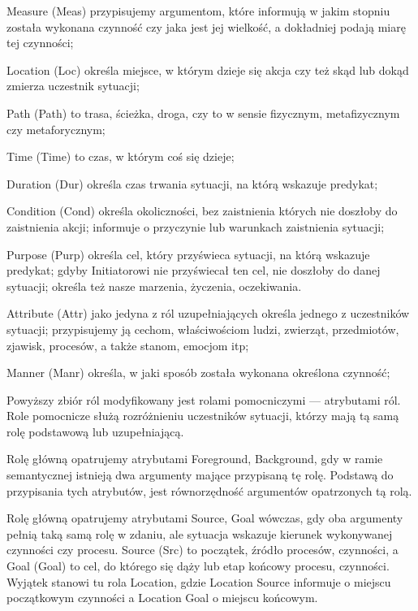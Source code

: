 \documentclass[a4paper,12pt]{article}
\begin{document}
\begin{description}
\item{Measure (Meas)} przypisujemy argumentom, które informują w jakim stopniu została wykonana czynność czy
jaka jest jej wielkość, a dokładniej podają miarę tej czynności;
\item{Location (Loc)} określa miejsce, w którym dzieje się akcja czy też skąd lub dokąd zmierza uczestnik sytuacji;
\item{Path (Path)} to trasa, ścieżka, droga, czy to w sensie fizycznym, metafizycznym czy metaforycznym;
\item{Time (Time)} to czas, w którym coś się dzieje;
\item{Duration (Dur)} określa czas trwania sytuacji, na którą wskazuje predykat;
\item{Condition (Cond)} określa okoliczności, bez zaistnienia których nie doszłoby do zaistnienia akcji; informuje o przyczynie lub warunkach zaistnienia sytuacji;
\item{Purpose (Purp)} określa cel, który przyświeca sytuacji, na którą wskazuje predykat; gdyby Initiatorowi nie przyświecał ten cel, nie doszłoby do danej sytuacji; określa też nasze marzenia, życzenia, oczekiwania.
\item{Attribute (Attr)} jako jedyna z ról uzupełniających określa jednego z uczestników sytuacji; przypisujemy ją
cechom, właściwościom ludzi, zwierząt, przedmiotów, zjawisk, procesów, a także stanom, emocjom itp;
\item{Manner (Manr)} określa, w jaki sposób została wykonana określona czynność;
\end{description}
Powyższy zbiór ról modyfikowany jest rolami pomocniczymi --- atrybutami ról.
Role pomocnicze służą rozróżnieniu uczestników sytuacji, którzy mają tą samą rolę podstawową lub uzupełniającą.

Rolę główną opatrujemy atrybutami Foreground, Background, gdy w ramie semantycznej
istnieją dwa argumenty mające przypisaną tę rolę. Podstawą do przypisania tych atrybutów, 
jest równorzędność argumentów opatrzonych tą rolą.

Rolę główną opatrujemy atrybutami Source, Goal wówczas, gdy oba argumenty pełnią taką samą rolę
w zdaniu, ale sytuacja wskazuje kierunek wykonywanej czynności czy procesu. Source (Src) to początek, 
źródło procesów, czynności, a Goal (Goal) to cel, do którego się dąży lub etap końcowy procesu, czynności.
Wyjątek stanowi tu rola Location, gdzie Location Source informuje o miejscu początkowym czynności a Location Goal o miejscu końcowym.
\end{document}
